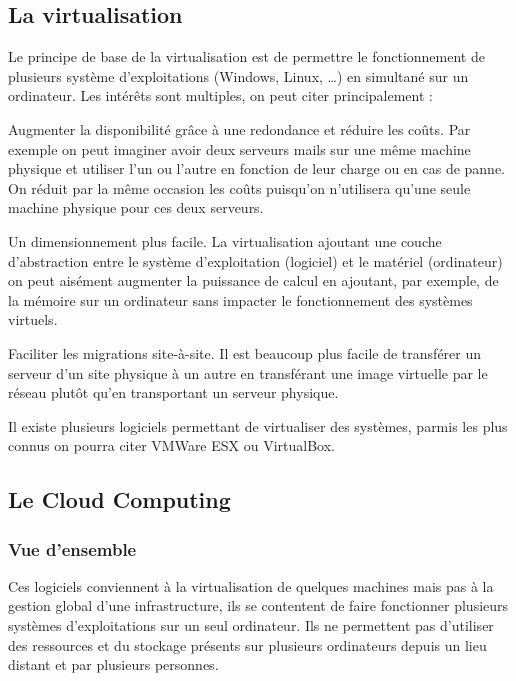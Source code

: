 \documentclass{report}
\begin{document}
\subsection{La virtualisation}
Le principe de base de la virtualisation est de permettre le fonctionnement de plusieurs système d’exploitations (Windows, Linux, …) en simultané sur un ordinateur.
Les intérêts sont multiples, on peut citer principalement :\newline

Augmenter la disponibilité grâce à une redondance et réduire les coûts. Par exemple on peut imaginer avoir deux serveurs mails sur une même machine physique et utiliser l’un ou l’autre en fonction de leur charge ou en cas de panne. On réduit par la même occasion les coûts puisqu’on n’utilisera qu’une seule machine physique pour ces deux serveurs.

Un dimensionnement plus facile. La virtualisation ajoutant une couche d’abstraction entre le système d’exploitation (logiciel) et le matériel (ordinateur) on peut aisément augmenter la puissance de calcul en ajoutant, par exemple, de la mémoire sur un ordinateur sans impacter le fonctionnement des systèmes virtuels.

Faciliter les migrations site-à-site. Il est beaucoup plus facile de transférer un serveur d’un site physique à un autre en transférant une image virtuelle par le réseau plutôt qu’en transportant un serveur physique.\newline

Il existe plusieurs logiciels permettant de virtualiser des systèmes, parmis les plus connus on pourra citer VMWare ESX ou VirtualBox.

\subsection{Le Cloud Computing}
\subsubsection{Vue d'ensemble}
Ces logiciels conviennent à la virtualisation de quelques machines mais pas à la gestion global d'une infrastructure, ils se contentent de faire fonctionner plusieurs systèmes d’exploitations sur un seul ordinateur. Ils ne permettent pas d'utiliser des ressources et du stockage présents sur plusieurs ordinateurs depuis un lieu distant et par plusieurs personnes.
\end{document}
